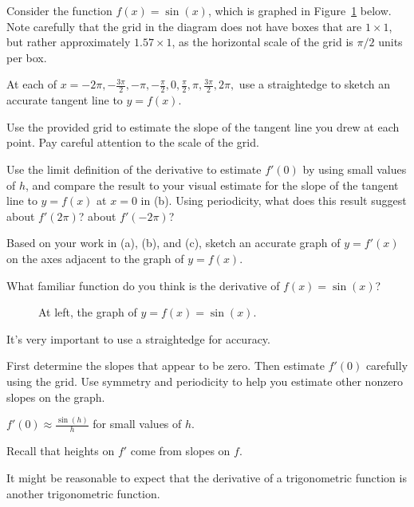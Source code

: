 \begin{activity} \label{A:2.2.1}  Consider the function $f(x) = \sin(x)$, which is graphed in Figure~\ref{F:2.2.A1} below.  Note carefully that the grid in the diagram does not have boxes that are $1 \times 1$, but rather approximately $1.57 \times 1$, as the horizontal scale of the grid is $\pi/2$ units per box.
\ba
	\item At each of $x = -2\pi, -\frac{3\pi}{2}, -\pi, -\frac{\pi}{2}, 0, \frac{\pi}{2}, \pi, \frac{3\pi}{2}, 2\pi,$ use a straightedge to sketch an accurate tangent line to $y = f(x)$.
	\item Use the provided grid to estimate the slope of the tangent line you drew at each point.  Pay careful attention to the scale of the grid.
	\item Use the limit definition of the derivative to estimate $f'(0)$ by using small values of $h$, and compare the result to your visual estimate for the slope of the tangent line to $y = f(x)$ at $x = 0$ in (b).  Using periodicity, what does this result suggest about $f'(2\pi)$?  about $f'(-2\pi)$?  
	\item Based on your work in (a), (b), and (c), sketch an accurate graph of $y = f'(x)$ on the axes adjacent to the graph of $y = f(x)$.
	\item What familiar function do you think is the derivative of $f(x) = \sin(x)$?
\ea
\begin{figure}[h]
\begin{center}
\caption{At left, the graph of $y = f(x) = \sin(x)$.} \label{F:2.2.A1}
\end{center}
\end{figure}

\end{activity}
\begin{smallhint}
\ba
	\item It's very important to use a straightedge for accuracy.
	\item First determine the slopes that appear to be zero.  Then estimate $f'(0)$ carefully using the grid.  Use symmetry and periodicity to help you estimate other nonzero slopes on the graph.
	\item $f'(0) \approx \frac{\sin(h)}{h}$ for small values of $h$. 
	\item Recall that heights on $f'$ come from slopes on $f$.
	\item It might be reasonable to expect that the derivative of a trigonometric function is another trigonometric function.
\ea
\end{smallhint}
